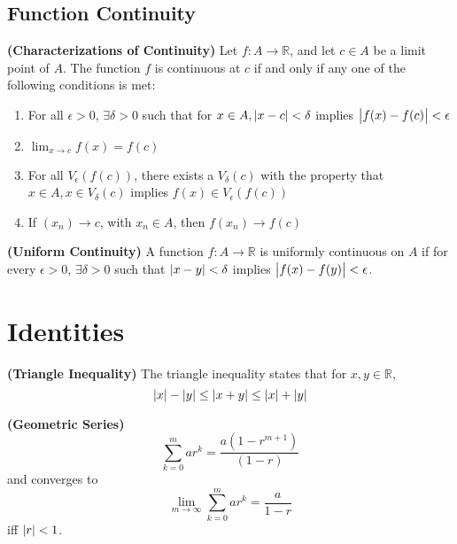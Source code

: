 \subsection{Function Continuity}
\begin{theorem}
  \textbf{\textup{(Characterizations of Continuity)}}
  Let $f : A \to \mathbb{R}$, and let $c \in A$ be a limit point of $A$.
  The function $f$ is continuous at $c$ if and only if any one of the following 
  conditions is met:
  \begin{enumerate}[label=(\roman*)]
    \item For all $\epsilon > 0$, $\exists \delta > 0$ such that for $x \in A, \abs{x - c} < \delta$
    implies $\abs{f(x) - f(c)} < \epsilon$
    \item $\lim_{x \to c} f(x) = f(c)$
    \item For all $V_\epsilon(f(c))$, there exists a $V_\delta(c)$ with the property that 
    $x \in A, x \in V_\delta(c)$ implies $f(x) \in V_\epsilon(f(c))$
    \item If $(x_n) \to c$, with $x_n \in A$, then $f(x_n) \to f(c)$
  \end{enumerate}
\end{theorem}

\begin{theorem}
  \textbf{\textup{(Uniform Continuity)}}
  A function $f:A\to \mathbb{R}$ is uniformly continuous on $A$
  if for every $\epsilon > 0$, $\exists \delta > 0$
  such that $\abs{x - y} < \delta$ implies $\abs{f(x) - f(y)} < \epsilon$.
\end{theorem}

\section{Identities}
\begin{identity}
  \textbf{\textup{(Triangle Inequality)}}
  The triangle inequality states that for $x, y \in \mathbb{R}$,
  \begin{equation}
    \abs{x} - \abs{y} \leq \abs{x + y} \leq \abs{x} + \abs{y}
  \end{equation}
\end{identity}

\begin{identity}
  \textbf{\textup{(Geometric Series)}}
  \begin{equation}
    \sum_{k=0}^m ar^k = \frac{a(1-r^{m+1})}{(1-r)}
    \label{eq:geometric_series}
  \end{equation}
  and converges to 
  \begin{equation*}
    \lim_{m\to\infty} \sum_{k=0}^m ar^k = \frac{a}{1-r}
  \end{equation*}
  iff $\abs{r} < 1$.
\end{identity}
